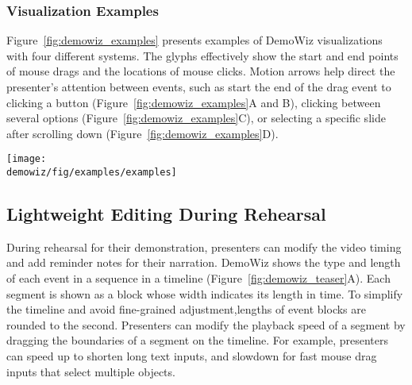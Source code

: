 
\subsubsection{Visualization Examples}
Figure~\ref{fig:demowiz_examples} presents examples of DemoWiz visualizations with four different systems. The glyphs effectively show the start and end points of mouse drags and the locations of mouse clicks. Motion arrows help direct the presenter's attention between events, such as start the end of the drag event to clicking a button (Figure~\ref{fig:demowiz_examples}A and B), clicking between several options (Figure~\ref{fig:demowiz_examples}C), or selecting a specific slide after scrolling down (Figure~\ref{fig:demowiz_examples}D).

\begin{figure*}[t]
  \centering
  \texttt{[image: \\demowiz/fig/examples/examples]}
  \caption{Examples of DemoWiz visualizations with four different systems and input event sequences.}
  \label{fig:demowiz_examples}
\end{figure*}


\subsection{Lightweight Editing During Rehearsal}
During rehearsal for their demonstration, presenters can modify the video timing and add reminder notes for their narration. DemoWiz shows the type and length of each event in a sequence in a timeline (Figure~\ref{fig:demowiz_teaser}A). Each segment is shown as a block whose width indicates its length in time. To simplify the timeline and avoid fine-grained adjustment,lengths of event blocks are rounded to the second. Presenters can modify the playback speed of a segment by dragging the boundaries of a segment on the timeline. For example, presenters can speed up to shorten long text inputs, and slowdown for fast mouse drag inputs that select multiple objects.

